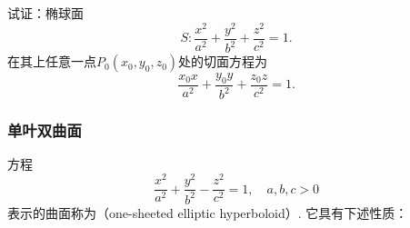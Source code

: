 \begin{example}
试证：椭球面\[
S: \frac{x^2}{a^2} + \frac{y^2}{b^2} + \frac{z^2}{c^2} = 1.
\]在其上任意一点\(P_0(x_0,y_0,z_0)\)处的切面方程为
\begin{equation}\label{equation:解析几何.椭球面的切平面}
\frac{x_0 x}{a^2} + \frac{y_0 y}{b^2} + \frac{z_0 z}{c^2} = 1.
\end{equation}
\end{example}

\subsubsection{单叶双曲面}
方程\begin{equation}\label{equation:解析几何.单叶双曲面}
	\frac{x^2}{a^2}+\frac{y^2}{b^2}-\frac{z^2}{c^2}=1,
	\quad a,b,c>0
\end{equation}
表示的曲面称为（one-sheeted elliptic hyperboloid）.
它具有下述性质：
